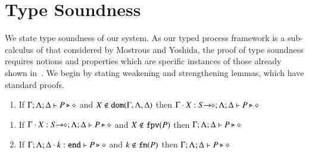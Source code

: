 \section{Type Soundness}
\label{app:ts}

We state type soundness of our system.
As our typed process framework is a sub-calculus of that considered
by Mostrous and Yoshida, the proof of type soundness requires notions
and properties which are specific instances of those already shown in~\cite{tlca07}.
We begin by stating weakening and strengthening lemmas,
which have standard proofs.

\begin{lemma}\rm
	\label{l:weak}
	\begin{enumerate}[$-$]
		\item	If $\Gamma; \Lambda; \Delta \vdash P \triangleright \diamond$
			and
			$X \not\in \mathtt{dom}(\Gamma,\Lambda,\Delta)$
			then
			$\Gamma\cdot X: S\!\! \rightarrow\!\! \diamond; \Lambda; \Delta \vdash P \triangleright \diamond$ 
	\end{enumerate}
\end{lemma}

\begin{lemma}\rm
	\label{l:stren}
	\begin{enumerate}[$-$]
		\item	If $\Gamma \cdot X: S\!\! \rightarrow\!\! \diamond; \Lambda; \Delta \vdash P \triangleright \diamond$
			and
			$X \not\in \mathtt{fpv}(P)$ then
			$\Gamma; \Lambda; \Delta \vdash P \triangleright \diamond$

		\item	If $\Gamma; \Lambda; \Delta \cdot k: \mathtt{end} \vdash P \triangleright \diamond$
			and
			$k \not\in \mathtt{fn}(P)$
			then
			$\Gamma; \Lambda; \Delta \vdash P \triangleright \diamond$
	\end{enumerate}
\end{lemma}

